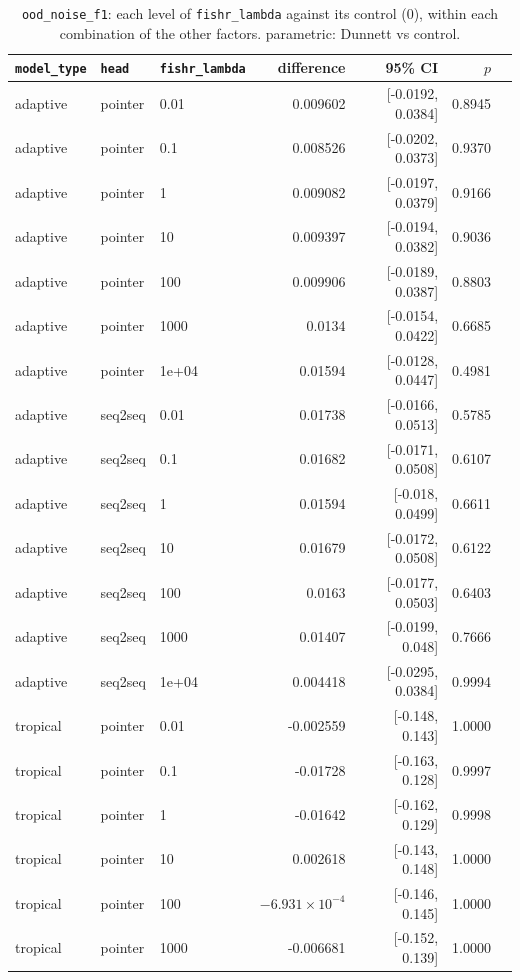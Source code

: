 \documentclass[10pt]{article}
\begin{document}
{\small
\begin{longtable}{lllrrrl}
\caption{\texttt{ood\_noise\_f1}: each level of \texttt{fishr\_lambda} against its control (0), within each combination of the other factors. parametric: Dunnett vs control.}\label{tab:control-ood_noise_f1}\\
\toprule
\texttt{model\_type} & \texttt{head} & \texttt{fishr\_lambda} & difference & 95\% CI & $p$ & \\
\midrule
\endhead
adaptive & pointer & 0.01 & 0.009602 & [-0.0192, 0.0384] & 0.8945 & \\
adaptive & pointer & 0.1 & 0.008526 & [-0.0202, 0.0373] & 0.9370 & \\
adaptive & pointer & 1 & 0.009082 & [-0.0197, 0.0379] & 0.9166 & \\
adaptive & pointer & 10 & 0.009397 & [-0.0194, 0.0382] & 0.9036 & \\
adaptive & pointer & 100 & 0.009906 & [-0.0189, 0.0387] & 0.8803 & \\
adaptive & pointer & 1000 & 0.0134 & [-0.0154, 0.0422] & 0.6685 & \\
adaptive & pointer & 1e+04 & 0.01594 & [-0.0128, 0.0447] & 0.4981 & \\
adaptive & seq2seq & 0.01 & 0.01738 & [-0.0166, 0.0513] & 0.5785 & \\
adaptive & seq2seq & 0.1 & 0.01682 & [-0.0171, 0.0508] & 0.6107 & \\
adaptive & seq2seq & 1 & 0.01594 & [-0.018, 0.0499] & 0.6611 & \\
adaptive & seq2seq & 10 & 0.01679 & [-0.0172, 0.0508] & 0.6122 & \\
adaptive & seq2seq & 100 & 0.0163 & [-0.0177, 0.0503] & 0.6403 & \\
adaptive & seq2seq & 1000 & 0.01407 & [-0.0199, 0.048] & 0.7666 & \\
adaptive & seq2seq & 1e+04 & 0.004418 & [-0.0295, 0.0384] & 0.9994 & \\
tropical & pointer & 0.01 & -0.002559 & [-0.148, 0.143] & 1.0000 & \\
tropical & pointer & 0.1 & -0.01728 & [-0.163, 0.128] & 0.9997 & \\
tropical & pointer & 1 & -0.01642 & [-0.162, 0.129] & 0.9998 & \\
tropical & pointer & 10 & 0.002618 & [-0.143, 0.148] & 1.0000 & \\
tropical & pointer & 100 & $-6.931\times10^{-4}$ & [-0.146, 0.145] & 1.0000 & \\
tropical & pointer & 1000 & -0.006681 & [-0.152, 0.139] & 1.0000 & \\

\end{longtable}}
\end{document}
